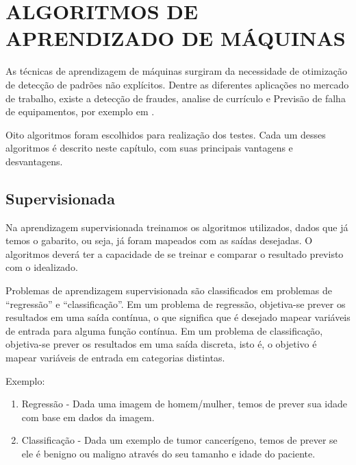 
\chapter{ALGORITMOS DE APRENDIZADO DE MÁQUINAS}

As técnicas de aprendizagem de máquinas surgiram da necessidade de otimização de detecção de padrões não explícitos. Dentre as diferentes aplicações no mercado de trabalho, existe a detecção de fraudes, analise de currículo e Previsão de falha de equipamentos, por exemplo em 
\cite{santander}.

Oito algoritmos foram escolhidos para realização dos testes. Cada um desses algoritmos é descrito neste capítulo, com suas principais vantagens e desvantagens.

\section{\textbf{Supervisionada}}
Na aprendizagem supervisionada treinamos os algoritmos utilizados, dados que já temos o gabarito, ou seja, já foram mapeados com as saídas desejadas. O algoritmos deverá ter a capacidade de se treinar e comparar o resultado previsto com o idealizado. 

Problemas de aprendizagem supervisionada são classificados em problemas de “regressão” e “classificação”. Em um problema de regressão, objetiva-se prever os resultados em uma saída contínua, o que significa que é desejado mapear variáveis de entrada para alguma função contínua. Em um problema de classificação, objetiva-se prever os resultados em uma saída discreta, isto é, o objetivo é mapear variáveis de entrada em categorias distintas\cite{aprendizagem}.

Exemplo:
 \renewcommand{\theenumi}{\Alph{enumi}}
 \begin{enumerate}
 
    \item Regressão - Dada uma imagem de homem/mulher, temos de prever sua idade com base em dados da imagem.
    \item Classificação - Dada um exemplo de tumor cancerígeno, temos de prever se ele é benigno ou maligno através do seu tamanho e idade do paciente.
     
 \end{enumerate}


